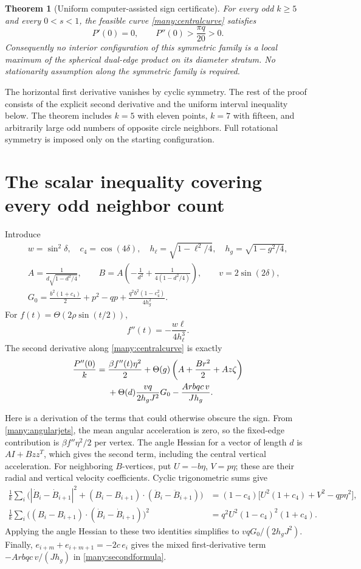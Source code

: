 \documentclass[11pt]{article}
\newtheorem{theorem}{Theorem}[section]
\theoremstyle{remark}\newtheorem{remark}[theorem]{Remark}
\newcommand{\Th}{\Theta}
\begin{document}
\begin{theorem}[Uniform computer-assisted sign certificate]\label{many:theorem}
For every odd $k\geq5$ and every $0<s<1$, the feasible curve
\eqref{many:centralcurve} satisfies
\[
 \boxed{P'(0)=0,\qquad P''(0)>\frac{\pi q}{20}>0.}
\]
Consequently no interior configuration of this symmetric family is
a local maximum of the spherical dual-edge product on its diameter
stratum. No stationarity assumption along the symmetric family is
required.
\end{theorem}

The horizontal first derivative vanishes by cyclic symmetry.
The rest of the proof consists of the explicit second derivative
and the uniform interval inequality below. The theorem includes
$k=5$ with eleven points, $k=7$ with fifteen, and arbitrarily large
odd numbers of opposite circle neighbors. Full rotational symmetry
is imposed only on the starting configuration.

\section{The scalar inequality covering every odd neighbor count}
Introduce
\begin{gather*}
 w=\sin^2\delta,\quad c_4=\cos(4\delta),\quad
 h_\ell=\sqrt{1-\ell^2/4},\quad h_g=\sqrt{1-g^2/4},\\
 A=\frac1{d\sqrt{1-d^2/4}},\qquad
 B=A\left(-\frac1{d^2}+\frac1{4(1-d^2/4)}\right),\qquad
 v=2\sin(2\delta),\\
 G_0=\frac{b^2(1+c_4)}2+p^2-qp
             +\frac{q^2b^2(1-c_4^2)}{4h_g^2}.
\end{gather*}
For $f(t)=\Th(2\rho\sin(t/2))$,
\[
 f''(t)=-\frac{w\ell}{4h_\ell^3}.
\]
The second derivative along \eqref{many:centralcurve} is exactly
\begin{align}
 \frac{P''(0)}k={}&
 \frac{\beta f''(t)\eta^2}{2}
 +\Th(g)\left(A+\frac{Br^2}{2}+Az\zeta\right) \notag\\
 &+\Th(d)\frac{vq}{2h_gJ^2}G_0
 -\frac{Arbqc\,v}{Jh_g}.\label{many:secondformula}
\end{align}

Here is a derivation of the terms that could otherwise obscure the
sign. From \eqref{many:angularjets}, the mean angular acceleration is
zero, so the fixed-edge contribution is $\beta f''\eta^2/2$ per
vertex. The angle Hessian for a vector of length $d$ is
$AI+Bzz^T$, which gives the second term, including the central
vertical acceleration. For neighboring $B$-vertices, put
$U=-b\eta$, $V=p\eta$; these are their radial and vertical
velocity coefficients. Cyclic trigonometric sums give
\begin{align*}
 \frac1k\sum_i\bigl(|\dot B_i-\dot B_{i+1}|^2
 +(B_i-B_{i+1})\cdot(\ddot B_i-\ddot B_{i+1})\bigr)
 &=(1-c_4)\bigl[U^2(1+c_4)+V^2-qp\eta^2\bigr],\\
 \frac1k\sum_i\bigl((B_i-B_{i+1})\cdot
                       (\dot B_i-\dot B_{i+1})\bigr)^2
 &=q^2U^2(1-c_4)^2(1+c_4).
\end{align*}
Applying the angle Hessian to these two identities simplifies to
$vqG_0/(2h_gJ^2)$. Finally,
$e_{i+m}+e_{i+m+1}=-2c\,e_i$ gives the mixed first-derivative
term $-Arbqc\,v/(Jh_g)$ in \eqref{many:secondformula}.
\end{document}
